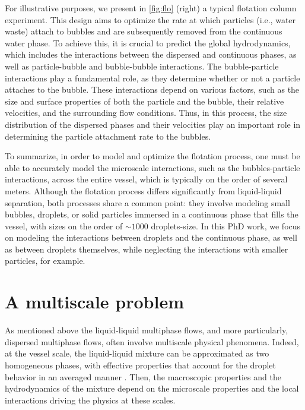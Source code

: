 For illustrative purposes, we present in \ref{fig:flo} (right) a typical flotation column experiment. 
This design aims to optimize the rate at which particles (i.e., water waste) attach to bubbles and are subsequently removed from the continuous water phase. 
To achieve this, it is crucial to predict the global hydrodynamics, which includes the interactions between the dispersed and continuous phases, as well as particle-bubble and bubble-bubble interactions.
The bubble-particle interactions play a fundamental role, as they determine whether or not a particle attaches to the bubble. 
These interactions depend on various factors, such as the size and surface properties of both the particle and the bubble, their relative velocities, and the surrounding flow conditions. 
Thus, in this process, the size distribution of the dispersed phases and their velocities play an important role in determining the particle attachment rate to the bubbles.



To summarize, in order to model and optimize the flotation process, one must be able to accurately model the microscale interactions, such as the bubbles-particle interactions, across the entire vessel, which is typically on the order of several meters. 
Although the flotation process differs significantly from liquid-liquid separation, both processes share a common point: they involve modeling small bubbles, droplets, or solid particles immersed in a continuous phase that fills the vessel, with sizes on the order of $\sim 1000$ droplets-size. 
In this PhD work, we focus on modeling the interactions between droplets and the continuous phase, as well as between droplets themselves, while neglecting the interactions with smaller particles, for example. 



\section{A multiscale problem} 


As mentioned above the liquid-liquid multiphase flows, and more particularly, dispersed multiphase flows, often involve multiscale physical phenomena. 
Indeed, at the vessel scale, the liquid-liquid mixture can be approximated as two homogeneous phases, with effective properties that account for the droplet behavior in an averaged manner \citet{jackson2000}.
Then, the macroscopic properties and the hydrodynamics of the mixture depend on the microscale properties and the local interactions driving the physics at these scales. 

